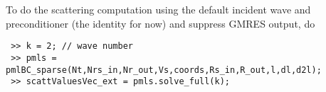 To do the
scattering computation using the default incident wave
and preconditioner (the identity for now)
and suppress GMRES output, do
\begin{verbatim}
 >> k = 2; // wave number
 >> pmls = pmlBC_sparse(Nt,Nrs_in,Nr_out,Vs,coords,Rs_in,R_out,l,dl,d2l);
 >> scattValuesVec_ext = pmls.solve_full(k);
\end{verbatim}
